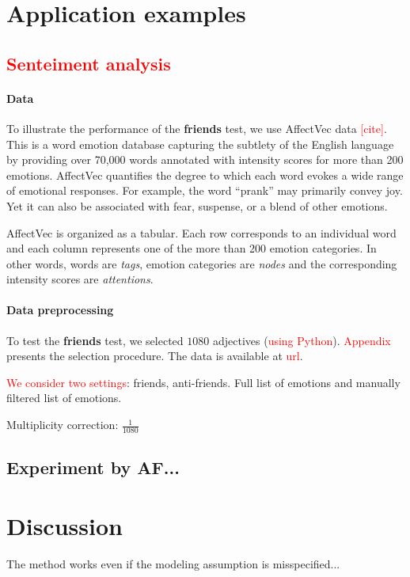 \documentclass{llncs}
\newcommand{\red}[1]{\textcolor{red}{#1}}
\begin{document}
\section{Application examples}
\label{sec:experiments}
\subsection{\red{Senteiment analysis}}
\paragraph{Data} To illustrate the performance of the 
\textbf{friends} test, we use AffectVec data \red{[cite]}. This is a word emotion database capturing the subtlety of the English language by providing over 70,000 words annotated with intensity scores for more than 200 emotions. AffectVec quantifies the degree to which each word evokes a wide range of emotional responses. For example, the word ``prank'' may primarily convey joy. Yet it can also be associated with fear, suspense, or a blend of other emotions.

AffectVec is organized as a tabular. Each row corresponds to an individual word and each column represents one of the more than 200 emotion categories. In other words, words are \textit{tags}, emotion categories are \textit{nodes} and the corresponding intensity scores are \textit{attentions}. 

\paragraph{Data preprocessing} To test the \textbf{friends} test, we selected $1080$ adjectives (\red{using Python}). \red{Appendix} presents the selection procedure. The data is available at \red{url}.

\red{We consider two settings}: friends, anti-friends. Full list of emotions and manually filtered list of emotions.

Multiplicity correction: $\frac{1}{1080}$

\subsection{Experiment by AF...}
\section{Discussion}
\label{sec:discussion}

The method works even if the modeling assumption is misspecified...
\end{document}
